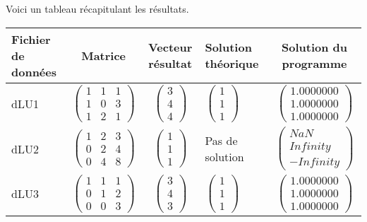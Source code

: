 \documentclass{article}
\theoremstyle{mes_theoremes}
\begin{document}
\bigskip
Voici un tableau récapitulant les résultats. \\
\begin{tabular}{|p{}|c|c|p{}|c|}
\hline
Fichier de données & Matrice & Vecteur résultat & Solution théorique & Solution du programme \\
\hline
 dLU1 & $\left(\begin{matrix}1 & 1 & 1 \\ 1 & 0 & 3\\1 & 2 & 1 \end{matrix}\right)$ & $\left(\begin{matrix} 3\\ 4\\ 4\end{matrix}\right)$ & $\left(\begin{matrix} 1\\ 1\\ 1\end{matrix}\right)$ & $\left(\begin{matrix} 1.0000000\\ 1.0000000\\ 1.0000000\end{matrix}\right)$\\
\hline
 dLU2 & $\left(\begin{matrix}1 & 2 & 3 \\ 0 & 2 & 4\\0 & 4 & 8 \end{matrix}\right)$ & $\left(\begin{matrix} 1\\ 1\\ 1\end{matrix}\right)$ & Pas de solution & $\left(\begin{matrix} NaN\\ Infinity\\ -Infinity\end{matrix}\right)$\\
\hline
 dLU3 & $\left(\begin{matrix}1 & 1 & 1 \\ 0 & 1 & 2\\0 & 0 & 3 \end{matrix}\right)$ & $\left(\begin{matrix} 3\\ 4\\ 3\end{matrix}\right)$ & $\left(\begin{matrix} 1\\ 1\\ 1\end{matrix}\right)$ & $\left(\begin{matrix} 1.0000000\\ 1.0000000\\ 1.0000000\end{matrix}\right)$\\

\end{tabular}
\end{document}
